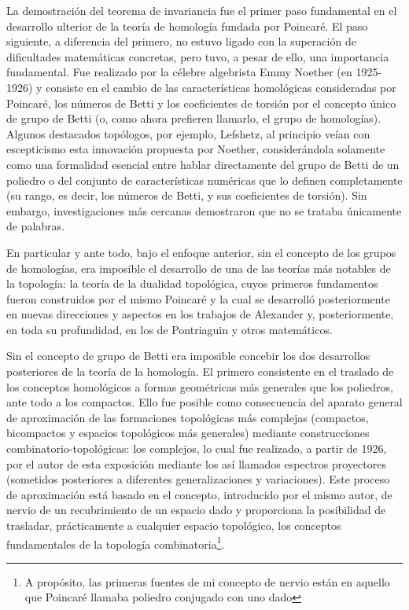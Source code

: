 \documentclass[a4paper, 12pt]{article}
\begin{document}
La demostración del teorema de invariancia fue el primer paso fundamental en el desarrollo ulterior de la teoría de homología fundada por Poincaré. El paso siguiente, a diferencia del primero, no estuvo ligado con la superación de dificultades matemáticas concretas, pero tuvo, a pesar de ello, una importancia fundamental. Fue realizado por la célebre algebrista Emmy Noether (en 1925-1926) y consiste en el cambio de las características homológicas consideradas por Poincaré, los números  de Betti y los coeficientes de torsión por el concepto único de grupo de Betti (o, como ahora prefieren llamarlo, el grupo de homologías). Algunos destacados topólogos, por ejemplo, Lefshetz, al principio veían con escepticismo esta innovación propuesta por Noether, considerándola solamente como una formalidad esencial entre hablar directamente del grupo de Betti de un poliedro o del conjunto de características numéricas que lo definen completamente (su rango, es decir, los números de Betti, y sus coeficientes de torsión). Sin embargo, investigaciones más cercanas demostraron que no se trataba únicamente de palabras.

En particular y ante todo, bajo el enfoque anterior, sin el concepto de los grupos de homologías, era imposible el desarrollo de una de las teorías más notables de la topología: la teoría de la dualidad topológica, cuyos primeros fundamentos fueron construidos por el mismo Poincaré y la cual se desarrolló posteriormente en nuevas direcciones y aspectos en los trabajos de Alexander
y, posteriormente, en toda su profundidad, en los de Pontriaguin y otros matemáticos.

Sin el concepto de grupo de Betti era imposible concebir los dos desarrollos posteriores de la teoría de la homología. El primero consistente en el traslado de los conceptos homológicos a formas geométricas más generales que los poliedros, ante todo a los compactos. Ello fue posible como consecuencia del aparato general de aproximación de las formaciones topológicas más complejas (compactos, bicompactos y espacios topológicos más generales) mediante construcciones combinatorio-topológicas: los complejos, lo cual fue realizado, a partir de 
1926, por el autor de esta exposición mediante los así llamados espectros proyectores (sometidos posteriores a diferentes generalizaciones y variaciones). Este proceso de aproximación está basado en el concepto, introducido por el mismo autor, de nervio de un recubrimiento de un espacio dado y proporciona la posibilidad de trasladar, prácticamente a cualquier espacio topológico, los conceptos fundamentales de la topología combinatoria\footnote{A propósito, las primeras fuentes de mi concepto de nervio están en aquello que Poincaré llamaba poliedro conjugado con uno dado}.
\end{document}
